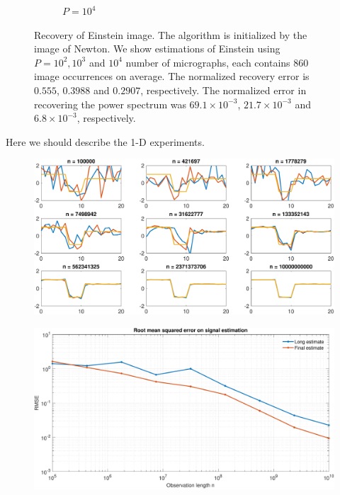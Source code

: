 \documentclass[english,11pt]{article}
\newcommand{\TODO}[1]{{\color{red}{[#1]}}}
\numberwithin{equation}{section}
\theoremstyle{plain}
\theoremstyle{definition}
\theoremstyle{remark}
\theoremstyle{plain}
\theoremstyle{remark}
\theoremstyle{plain}
\theoremstyle{plain}
\begin{document}
\begin{figure}[h!]
\begin{subfigure}[h]{0.25\textwidth}
		\caption{$P = 10^4$}
	\end{subfigure}%
	\caption{\label{fig:Einst_example} Recovery of Einstein image. The algorithm is initialized by the image of Newton. We show estimations of Einstein using $P=10^2,10^3$ and $10^4$ number of micrographs, each contains $860$ image occurrences on average. The normalized recovery error is $0.555$, $0.3988$ and $0.2907$, respectively. The normalized error in recovering the power spectrum was $69.1\times10^{-3} $, $21.7\times10^{-3} $ and $6.8\times10^{-3}$, respectively. \TODO{This image will be more impressive in the future}}	
\end{figure}


Here we should describe the 1-D experiments.


\begin{figure}[t]
	\centering
	\includegraphics[scale=0.6]{XP_1D_homogeneous_new_ROI/progressive_n10000000000_107521}
	\caption{\TODO{...} \TODO{This figure is with new ROI method based on loss functions}}
	\label{fig:1Dhomosignals}
\end{figure}

\begin{figure}[t]
	\centering
	\includegraphics[width=0.7\linewidth]{XP_1D_homogeneous_new_ROI/progressive_RMSE_n10000000000_107521}
	\caption{\TODO{...} \TODO{This figure is with new ROI method based on loss functions}}
	\label{fig:1DhomoRMSE}
\end{figure}
\end{document}
